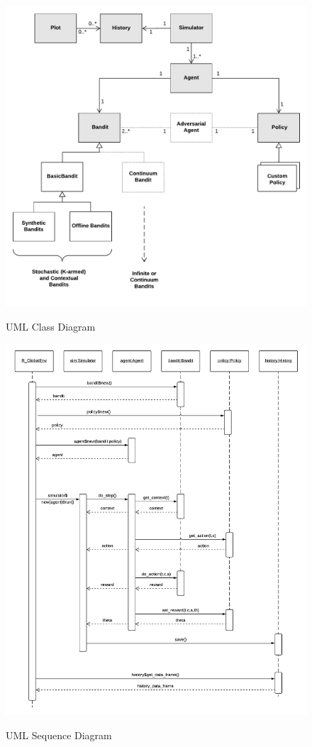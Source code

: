 \documentclass{jss}\usepackage[]{graphicx}\usepackage[]{color}
\begin{document}
\begin{figure}[H]
  \centering
    \includegraphics[width=.99\textwidth]{fig/contextual_class}
    \label{fig:contextual_class}
      \caption{ UML Class Diagram}
\end{figure}

\begin{figure}[H]
  \centering
    \includegraphics[width=.99\textwidth]{fig/contextual_sequence}
    \label{fig:contextual_sequence}
      \caption{ UML Sequence Diagram}
\end{figure}
\end{document}
